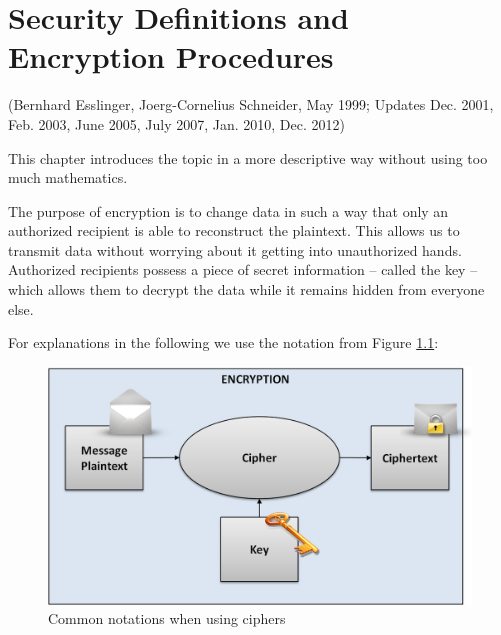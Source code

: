 %
%

\makeatletter \renewcommand{\thepage}{~\csname @arabic\endcsname \c@page~} \makeatother
\hypertarget{Kapitel_1}{}
\chapter{Security Definitions and Encryption Procedures}
\label{Label_Kapitel_1}
(Bernhard Esslinger, Joerg-Cornelius Schneider, May 1999; Updates Dec. 2001, Feb. 2003,
June 2005, July 2007, Jan. 2010, Dec. 2012)

This chapter introduces the topic in a more descriptive way without using too much mathematics.

The purpose of encryption  is to change data in such a way
that only an authorized recipient is able to reconstruct the plaintext. This
allows us to transmit data without worrying about it getting into unauthorized
hands. Authorized recipients possess a piece of secret information -- called the
key -- which allows them to decrypt the data while it remains hidden from
everyone else.%

For explanations in the following we use the notation from 
Figure \ref{Generic-Notations-when-Encrypting}:
\begin{figure}[ht]
\begin{center}
\includegraphics[scale=0.7]{figures/Generic-Notation-Encryption_en.png}
\caption{Common notations when using ciphers} 
\label{Generic-Notations-when-Encrypting}
\end{center}
\end{figure}


